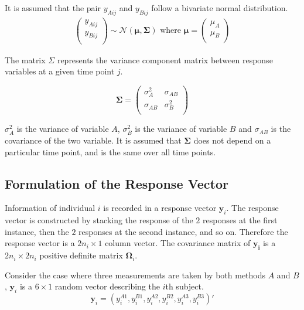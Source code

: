 \documentclass[MAIN.tex]{subfiles}
\begin{document}
	It is assumed that the pair $y_{Aij}$ and $y_{Bij}$ follow a bivariate normal distribution.
	\begin{eqnarray*}
		\left(
		\begin{array}{c}
			y_{Aij} \\
			y_{Bij} \\
		\end{array}
		\right) \sim \mathcal{N}(
		\boldsymbol{\mu}, \boldsymbol{\Sigma})\mbox{   where } \boldsymbol{\mu} = \left(
		\begin{array}{c}
			\mu_{A} \\
			\mu_{B} \\
		\end{array}
		\right)
	\end{eqnarray*}
	
	The matrix $\Sigma$ represents the variance component matrix between response variables at a given time point $j$.
	
	\[
	\boldsymbol{\Sigma} = \left( \begin{array}{cc}
	\sigma^2_{A} & \sigma_{AB} \\
	\sigma_{AB} & \sigma^2_{B}\\
	\end{array}   \right)
	\]
	
	$\sigma^2_{A}$ is the variance of variable $A$, $\sigma^2_{B}$ is the variance of variable $B$ and $\sigma_{AB}$ is the covariance of the two variable. It is assumed that $\boldsymbol{\Sigma}$ does not depend on a particular time point, and is the same over all time points.
	
	\subsection{Formulation of the Response Vector}
	Information of individual $i$ is recorded in a response vector $\boldsymbol{y}_{i}$. The response vector is constructed by stacking the response of the $2$ responses at the first instance, then the $2$ responses at the second instance, and so on. Therefore the response vector is a $2n_{i} \times 1$ column vector.
	The covariance matrix of $\boldsymbol{y_{i}}$ is a $2n_{i} \times 2n_{i}$ positive definite matrix $\boldsymbol{\Omega}_{i}$.
	
	Consider the case where three measurements are taken by both methods $A$ and $B$, $\boldsymbol{y}_{i}$ is a $6 \times 1$ random vector describing the $i$th subject.
	\[
	\boldsymbol{y}_{i} = (y_{i}^{A1},y_{i}^{B1},y_{i}^{A2},y_{i}^{B2},y_{i}^{A3},y_{i}^{B3}) \prime
	\]
	
\end{document}

